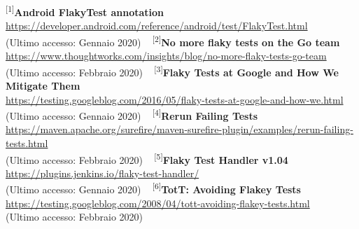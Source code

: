 \fancyhead[C]{}
\textsuperscript{[1]}\textbf{Android FlakyTest annotation}\\
\url{https://developer.android.com/reference/android/test/FlakyTest.html}\\
(Ultimo accesso: Gennaio 2020)
\newline~\newline
\textsuperscript{[2]}\textbf{No more flaky tests on the Go team}\\
\url{https://www.thoughtworks.com/insights/blog/no-more-flaky-tests-go-team}\\
(Ultimo accesso: Febbraio 2020)
\newline~\newline
\textsuperscript{[3]}\textbf{Flaky Tests at Google and How We Mitigate Them}\\
\url{https://testing.googleblog.com/2016/05/flaky-tests-at-google-and-how-we.html}\\
(Ultimo accesso: Gennaio 2020)
\newline~\newline
\textsuperscript{[4]}\textbf{Rerun Failing Tests}\\
\url{https://maven.apache.org/surefire/maven-surefire-plugin/examples/rerun-failing-tests.html}\\
(Ultimo accesso: Febbraio 2020)
\newline~\newline
\textsuperscript{[5]}\textbf{Flaky Test Handler v1.04}\\
\url{https://plugins.jenkins.io/flaky-test-handler/}\\
(Ultimo accesso: Gennaio 2020)
\newline~\newline
\textsuperscript{[6]}\textbf{TotT: Avoiding Flakey Tests}\\
\url{https://testing.googleblog.com/2008/04/tott-avoiding-flakey-tests.html}\\
(Ultimo accesso: Febbraio 2020)
\\

